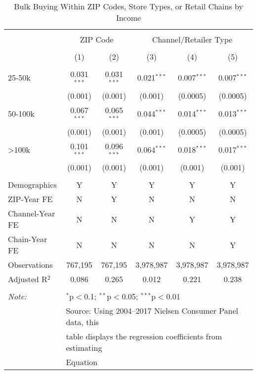
\begin{table}[!htbp] \centering 
  \caption{Bulk Buying Within ZIP Codes, Store Types, or Retail Chains by Income} 
  \label{tab:discountingBehaviorFE} 
\begin{tabular}{@{\extracolsep{5pt}}lccccc} 
\\[-1.8ex]\hline 
\hline \\[-1.8ex] 
 & \multicolumn{2}{c}{ZIP Code} & \multicolumn{3}{c}{Channel/Retailer Type} \\ 
\\[-1.8ex] & (1) & (2) & (3) & (4) & (5)\\ 
\hline \\[-1.8ex] 
 25-50k & 0.031$^{***}$ & 0.031$^{***}$ & 0.021$^{***}$ & 0.007$^{***}$ & 0.007$^{***}$ \\ 
  & (0.001) & (0.001) & (0.001) & (0.0005) & (0.0005) \\ 
  50-100k & 0.067$^{***}$ & 0.065$^{***}$ & 0.044$^{***}$ & 0.014$^{***}$ & 0.013$^{***}$ \\ 
  & (0.001) & (0.001) & (0.001) & (0.0005) & (0.0005) \\ 
  >100k & 0.101$^{***}$ & 0.096$^{***}$ & 0.064$^{***}$ & 0.018$^{***}$ & 0.017$^{***}$ \\ 
  & (0.001) & (0.001) & (0.001) & (0.001) & (0.001) \\ 
 \hline \\[-1.8ex] 
Demographics & Y & Y & Y & Y & Y \\ 
ZIP-Year FE & N & Y & N & N & N \\ 
Channel-Year FE & N & N & N & Y & Y \\ 
Chain-Year FE & N & N & N & N & Y \\ 
Observations & 767,195 & 767,195 & 3,978,987 & 3,978,987 & 3,978,987 \\ 
Adjusted R$^{2}$ & 0.086 & 0.265 & 0.012 & 0.221 & 0.238 \\ 
\hline 
\hline \\[-1.8ex] 
\textit{Note:}  & \multicolumn{5}{l}{$^{*}$p$<$0.1; $^{**}$p$<$0.05; $^{***}$p$<$0.01} \\ 
 & \multicolumn{5}{l}{Source: Using 2004--2017 Nielsen Consumer Panel data, this } \\ 
 & \multicolumn{5}{l}{table displays the regression coefficients from estimating } \\ 
 & \multicolumn{5}{l}{Equation 
}
\end{tabular}
\end{table}
